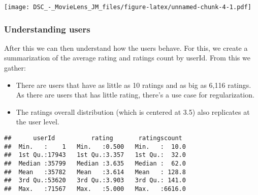 \documentclass[]{article}
\newenvironment{Shaded}{\begin{snugshade}}{\end{snugshade}}
\newcommand{\KeywordTok}[1]{\textcolor[rgb]{0.13,0.29,0.53}{\textbf{#1}}}
\newcommand{\DataTypeTok}[1]{\textcolor[rgb]{0.13,0.29,0.53}{#1}}
\newcommand{\StringTok}[1]{\textcolor[rgb]{0.31,0.60,0.02}{#1}}
\newcommand{\OperatorTok}[1]{\textcolor[rgb]{0.81,0.36,0.00}{\textbf{#1}}}
\newcommand{\NormalTok}[1]{#1}
\providecommand{\tightlist}{%
  \setlength{\itemsep}{0pt}\setlength{\parskip}{0pt}}
\begin{document}
\texttt{[image: DSC\_-\_MovieLens\_JM\_files/figure-latex/unnamed-chunk-4-1.pdf]}

\subsubsection{Understanding users}\label{understanding-users}

After this we can then understand how the users behave. For this, we
create a summarization of the average rating and ratings count by
userId. From this we gather:

\begin{itemize}
\tightlist
\item
  There are users that have as little as 10 ratings and as big as 6,116
  ratings. As there are users that has little rating, there's a use case
  for regularization.
\item
  The ratings overall distribution (which is centered at 3.5) also
  replicates at the user level.
\end{itemize}

\begin{Shaded}
\end{Shaded}

\begin{verbatim}
##      userId          rating       ratingscount   
##  Min.   :    1   Min.   :0.500   Min.   :  10.0  
##  1st Qu.:17943   1st Qu.:3.357   1st Qu.:  32.0  
##  Median :35799   Median :3.635   Median :  62.0  
##  Mean   :35782   Mean   :3.614   Mean   : 128.8  
##  3rd Qu.:53620   3rd Qu.:3.903   3rd Qu.: 141.0  
##  Max.   :71567   Max.   :5.000   Max.   :6616.0
\end{verbatim}

\begin{Shaded}
\end{Shaded}
\end{document}
